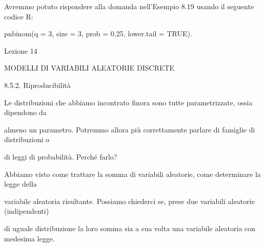 \documentclass[a4paper,portrait,12pt]{article}
\begin{document}
\begin{flushleft}
Avremmo potuto rispondere alla domanda nell'Esempio 8.19 usando il seguente codice R:
\end{flushleft}


\begin{flushleft}
pnbinom(q = 3, size = 3, prob = 0.25, lower.tail = TRUE).
\end{flushleft}










\begin{flushleft}
Lezione 14
\end{flushleft}





\begin{flushleft}
MODELLI DI VARIABILI ALEATORIE DISCRETE
\end{flushleft}





\begin{flushleft}
8.5.2. Riproducibilit\`{a}
\end{flushleft}


\begin{flushleft}
Le distribuzioni che abbiamo incontrato finora sono tutte parametrizzate, ossia dipendono da
\end{flushleft}


\begin{flushleft}
almeno un parametro. Potremmo allora più correttamente parlare di famiglie di distribuzioni o
\end{flushleft}


\begin{flushleft}
di leggi di probabilit\`{a}. Perch\'{e} farlo?
\end{flushleft}


\begin{flushleft}
Abbiamo visto come trattare la somma di variabili aleatorie, come determinare la legge della
\end{flushleft}


\begin{flushleft}
variabile aleatoria risultante. Possiamo chiederci se, prese due variabili aleatorie (indipendenti)
\end{flushleft}


\begin{flushleft}
di uguale distribuzione la loro somma sia a sua volta una variabile aleatoria con medesima legge.
\end{flushleft}
\end{document}

